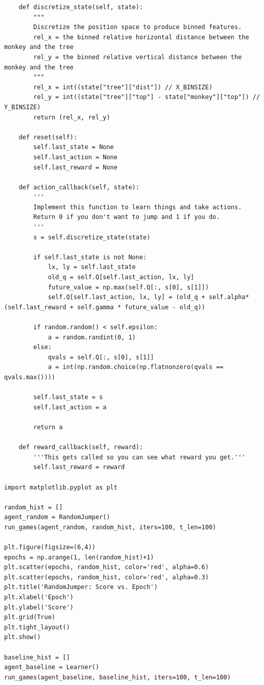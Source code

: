 \documentclass[submit]{../harvardml}
\begin{document}
\begin{lstlisting}
    def discretize_state(self, state):
        """
        Discretize the position space to produce binned features.
        rel_x = the binned relative horizontal distance between the monkey and the tree
        rel_y = the binned relative vertical distance between the monkey and the tree
        """
        rel_x = int((state["tree"]["dist"]) // X_BINSIZE)
        rel_y = int((state["tree"]["top"] - state["monkey"]["top"]) // Y_BINSIZE)
        return (rel_x, rel_y)
    
    def reset(self):
        self.last_state = None
        self.last_action = None
        self.last_reward = None

    def action_callback(self, state):
        '''
        Implement this function to learn things and take actions.
        Return 0 if you don't want to jump and 1 if you do.
        '''
        s = self.discretize_state(state)

        if self.last_state is not None:
            lx, ly = self.last_state
            old_q = self.Q[self.last_action, lx, ly]
            future_value = np.max(self.Q[:, s[0], s[1]])
            self.Q[self.last_action, lx, ly] = (old_q + self.alpha* (self.last_reward + self.gamma * future_value - old_q))

        if random.random() < self.epsilon:
            a = random.randint(0, 1)
        else:
            qvals = self.Q[:, s[0], s[1]]
            a = int(np.random.choice(np.flatnonzero(qvals == qvals.max())))

        self.last_state = s
        self.last_action = a

        return a
    
    def reward_callback(self, reward):
        '''This gets called so you can see what reward you get.'''
        self.last_reward = reward

import matplotlib.pyplot as plt

random_hist = []
agent_random = RandomJumper()
run_games(agent_random, random_hist, iters=100, t_len=100)

plt.figure(figsize=(6,4))
epochs = np.arange(1, len(random_hist)+1)
plt.scatter(epochs, random_hist, color='red', alpha=0.6)
plt.scatter(epochs, random_hist, color='red', alpha=0.3)
plt.title('RandomJumper: Score vs. Epoch')
plt.xlabel('Epoch')
plt.ylabel('Score')
plt.grid(True)
plt.tight_layout()
plt.show()

baseline_hist = []
agent_baseline = Learner()
run_games(agent_baseline, baseline_hist, iters=100, t_len=100)


\end{lstlisting}
\end{document}
